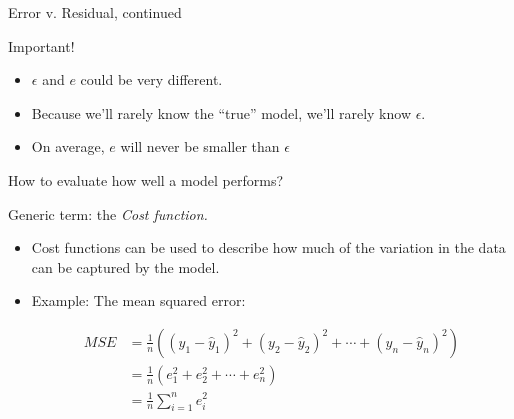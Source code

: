 \documentclass[aspectratio=169]{beamer}
\begin{document}
\begin{frame}{Error v. Residual, continued}

Important!  
\begin{itemize}
\item $\epsilon$ and $e$ could be very different.  
\item Because we'll rarely know the ``true'' model, we'll rarely know $\epsilon$.
\item On average, $e$ will never be smaller than $\epsilon$
\end{itemize}
\end{frame}

\begin{frame}{How to evaluate how well a model performs?}

Generic term: the \textit{Cost function.}

\begin{itemize}
\item Cost functions can be used to describe how much of the variation in the data can be captured by the model.
\item Example: The mean squared error:

\begin{align*}
MSE &= \frac{1}{n} ((y_1 - \hat{y}_1)^2 + (y_2 - \hat{y}_2)^2 + \cdots + (y_n - \hat{y}_n)^2) \\
&= \frac{1}{n} (e_1^2 + e_2^2 + \cdots + e_n^2) \\
&=\frac{1}{n} \sum_{i=1}^n e_i^2
\end{align*}
\end{itemize}

\end{frame}
\end{document}
